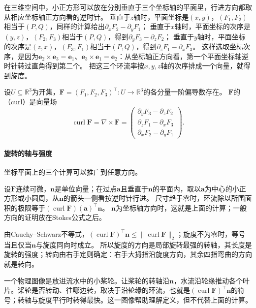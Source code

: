 在三维空间中，小正方形可以放在分别垂直于三个坐标轴的平面里，行进方向都取从相应坐标轴正方向看的逆时针。
垂直于$z$轴时，平面坐标是$(x,y)$，$(F_1,F_2)$相当于$(P,Q)$，同样的计算给出$\partial_xF_2-\partial_yF_1$；
垂直于$x$轴时，平面坐标的次序是$(y,z)$，$(F_2,F_3)$相当于$(P,Q)$，得到$\partial_yF_3-\partial_zF_2$；
垂直于$y$轴时，平面坐标的次序是$(z,x)$，$(F_3,F_1)$相当于$(P,Q)$，得到$\partial_zF_1-\partial_xF_3$。
这样选取坐标次序，是因为$\bm e_2\times\bm e_3=\bm e_1$、$\bm e_3\times\bm e_1=\bm e_2$：从坐标轴正方向看，第一个平面坐标轴逆时针转过直角得到第二个。
把这三个环流率按$x,y,z$轴的次序排成一个向量，就得到旋度。
\begin{definition}[旋度]
\label{def:multivariable-curl}
设$U\subseteq\mathbb R^3$为开集，$\bm F=(F_1,F_2,F_3)^\top:U\to\mathbb R^3$的各分量一阶偏导数存在。
$\bm F$的（curl）是向量场
\begin{equation}
 \operatorname{curl}\bm F=\nabla\times\bm F
 =\begin{pmatrix}
   \partial_yF_3-\partial_zF_2\\
   \partial_zF_1-\partial_xF_3\\
   \partial_xF_2-\partial_yF_1
  \end{pmatrix}.
 \label{eq:multivariable-curl}
\end{equation}
\end{definition}

\paragraph{旋转的轴与强度}

坐标平面上的三个计算可以推广到任意方向。

设$\bm F$连续可微，$\bm n$是单位向量；在过点$\bm a$且垂直于$\bm n$的平面内，取以$\bm a$为中心的小正方形或小圆周，从$\bm n$的箭头一侧看按逆时针行进。
尺寸趋于零时，环流除以所围面积的极限等于$(\operatorname{curl}\bm F)(\bm a)^\top\bm n$。
$\bm n$为坐标轴方向时，这就是上面的计算；一般方向的证明放在Stokes公式之后。

由Cauchy--Schwarz不等式，$(\operatorname{curl}\bm F)^\top\bm n\leq\lVert\operatorname{curl}\bm F\rVert_2$；旋度不为零时，等号当且仅当$\bm n$与旋度同向时成立。
所以旋度的方向是局部旋转最强的转轴，其长度是旋转的强度；转向由右手定则确定：右手大拇指沿旋度方向，其余四指弯曲的方向就是转向。

一个物理图像是放进流水中的小桨轮。让桨轮的转轴沿$\bm n$，水流沿轮缘推动各个叶片。桨轮是否转动、往哪边转，取决于沿轮缘的环流，也就是$(\operatorname{curl}\bm F)^\top\bm n$的符号；转轴与旋度平行时转得最快。这一图像帮助理解定义，但不代替上面的计算。

